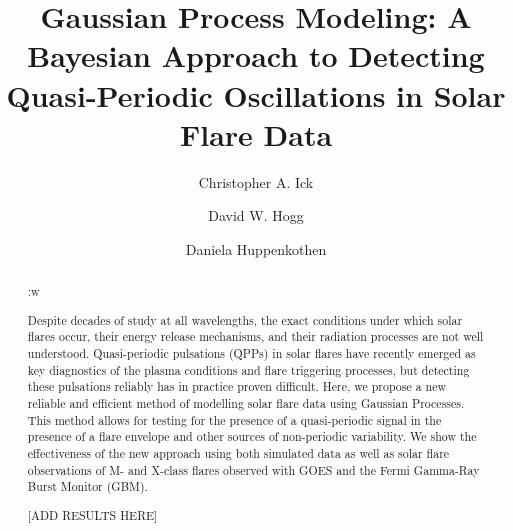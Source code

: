 \documentclass{aastex61}
\begin{document}
\title{Gaussian Process Modeling: A Bayesian Approach to Detecting Quasi-Periodic Oscillations in Solar Flare Data} \label{sec:title and authors}

\author{Christopher A. Ick}

\author{David W. Hogg}

\author{Daniela Huppenkothen}

\begin{abstract} \label{sec:abstract} :w

Despite decades of study at all wavelengths, the exact conditions under which solar flares occur, their energy release mechanisms, and their radiation processes are not well understood. Quasi-periodic pulsations (QPPs) in solar flares have recently emerged as key diagnostics of the plasma conditions and flare triggering processes, but detecting these pulsations reliably has in practice proven difficult. Here, we propose a new reliable and efficient method of modelling solar flare data using Gaussian Processes. This method allows for testing for the presence of a quasi-periodic signal in the presence of a flare envelope and other sources of non-periodic variability. We show the effectiveness of the new approach using both simulated data as well as solar flare observations of M- and X-class flares observed with GOES and the Fermi Gamma-Ray Burst Monitor (GBM).

[ADD RESULTS HERE]

\end{abstract}
\end{document}
